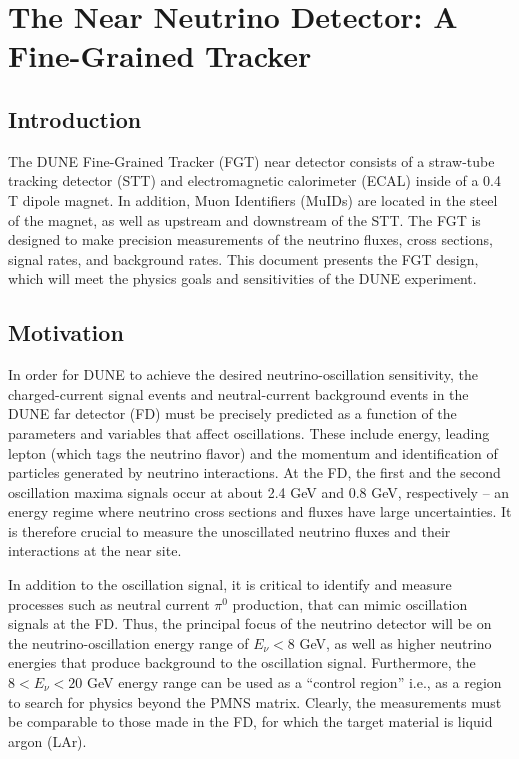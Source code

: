 
\chapter{The Near Neutrino Detector: A Fine-Grained Tracker}
\label{ch:nd-nnd}

\section{Introduction} 
\label{sec:nd-nnd-intro}

The DUNE Fine-Grained Tracker (FGT) near detector consists of a straw-tube
tracking detector (STT) and electromagnetic calorimeter (ECAL) inside of a 0.4 T
dipole magnet. In addition, Muon Identifiers (MuIDs) are located in the
steel of the magnet, as well as upstream and downstream of the STT. The FGT
is designed to make precision measurements of the neutrino fluxes, 
cross sections, signal rates, and background rates. 
This document presents 
the FGT design, which 
will meet the physics goals and sensitivities of the DUNE experiment. 

\section{Motivation}
\label{sec:nd-nnd-motivation}

In order for DUNE to achieve the desired neutrino-oscillation sensitivity, the 
charged-current signal events and neutral-current
background events in the DUNE far detector (FD) must be precisely 
predicted as a function of the parameters and variables that affect 
oscillations. These include energy, leading lepton (which tags the neutrino flavor) and the 
momentum and identification of particles generated by neutrino interactions. 
At the FD, the first and the second 
oscillation maxima signals occur at about 2.4 GeV and 0.8 GeV, respectively 
-- an energy regime where neutrino cross sections and fluxes have large 
uncertainties. It is therefore crucial to measure the unoscillated neutrino fluxes and 
their interactions at the near site. 

In addition to the oscillation signal, it is 
critical to identify and measure processes such as neutral current $\pi^0$ production,
that can mimic oscillation signals 
at the FD. Thus, the principal focus of the neutrino detector will be 
on the neutrino-oscillation energy range of $E_\nu < 8$ GeV, as well as higher 
neutrino energies that produce background to the oscillation signal. Furthermore, the
$8<E_\nu < 20$ GeV energy range can be used as a ``control region'' %
i.e., as a region
to search for physics beyond the PMNS matrix. Clearly, 
the measurements must be 
comparable to those made in the FD, for which the target material is liquid argon (LAr). 

